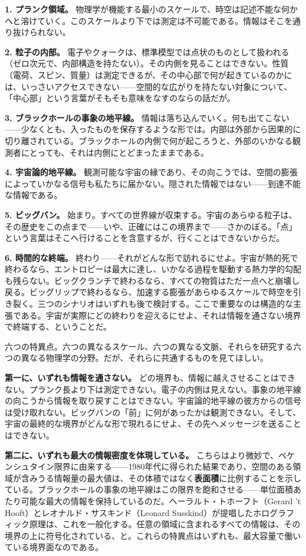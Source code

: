 \documentclass[11pt, twoside, openright]{book}
\begin{document}
\textbf{1. プランク領域。} 物理学が機能する最小のスケールで、時空は記述不能な何かへと溶けていく。このスケールより下では測定は不可能である。情報はそこを通り抜けられない。

\textbf{2. 粒子の内部。} 電子やクォークは、標準模型では点状のものとして扱われる（ゼロ次元で、内部構造を持たない）。その内側を見ることはできない。性質（電荷、スピン、質量）は測定できるが、その中心部で何が起きているのかには、いっさいアクセスできない------空間的な広がりを持たない対象について、「中心部」という言葉がそもそも意味をなすのならの話だが。

\textbf{3. ブラックホールの事象の地平線。} 情報は落ち込んでいく。何も出てこない------少なくとも、入ったものを保存するような形では。内部は外部から因果的に切り離されている。ブラックホールの内側で何が起ころうと、外部のいかなる観測者にとっても、それは内側にとどまったままである。

\textbf{4. 宇宙論的地平線。} 観測可能な宇宙の縁であり、その向こうでは、空間の膨張によっていかなる信号も私たちに届かない。隠された情報ではない------到達不能な情報である。

\textbf{5. ビッグバン。} 始まり。すべての世界線が収束する。宇宙のあらゆる粒子は、その歴史をこの点まで------いや、正確にはこの境界まで------さかのぼる。「点」という言葉はそこへ行けることを含意するが、行くことはできないからだ。

\textbf{6. 時間的な終端。} 終わり------それがどんな形で訪れるにせよ。宇宙が熱的死で終わるなら、エントロピーは最大に達し、いかなる過程を駆動する熱力学的勾配も残らない。ビッグクランチで終わるなら、すべての物質はただ一点へと崩壊し戻る。ビッグリップで終わるなら、加速する膨張があらゆるスケールで時空を引き裂く。三つのシナリオはいずれも後で検討する。ここで重要なのは構造的な主張である。宇宙が実際にどの終わりを迎えるにせよ、それは情報を通さない境界で終端する、ということだ。

六つの特異点。六つの異なるスケール、六つの異なる文脈、それらを研究する六つの異なる物理学の分野。だが、それらに共通するものを見てほしい。

\textbf{第一に、いずれも情報を通さない。} どの境界も、情報に越えさせることはできない。プランク長より下は測定できない。電子の内側は見えない。事象の地平線の向こうから情報を取り戻すことはできない。宇宙論的地平線の彼方からの信号は受け取れない。ビッグバンの「前」に何があったかは観測できない。そして、宇宙の最終的な境界がどんな形で現れるにせよ、その先へメッセージを送ることはできない。

\textbf{第二に、いずれも最大の情報密度を体現している。} こちらはより微妙で、ベケンシュタイン限界に由来する------1980年代に得られた結果であり、空間のある領域が含みうる情報量の最大値は、その体積ではなく\textbf{表面積}に比例することを示している。ブラックホールの事象の地平線はこの限界を飽和させる------単位面積あたり可能な最大の情報を保持しているのだ。ヘーラルト・トホーフト（Gerard 't Hooft）とレオナルド・サスキンド（Leonard Susskind）が提唱したホログラフィック原理は、これを一般化する。任意の領域に含まれるすべての情報は、その境界の上に符号化されている、と。これらの特異点はいずれも、最大容量で働いている境界面なのである。
\end{document}
